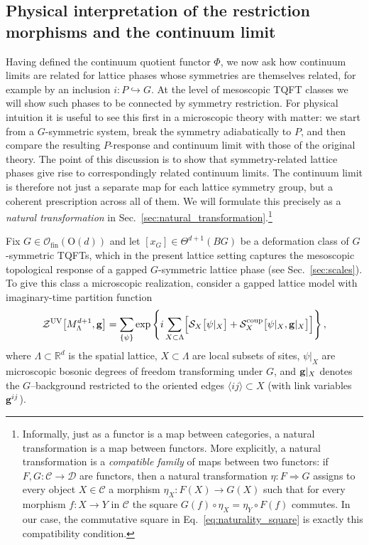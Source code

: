 \documentclass[aps,prx,reprint,superscriptaddress,twocolumn,amsmath,amssymb,amsfonts, nofootinbib]{revtex4-2}
\newcommand{\ofin}{\mathcal{O}_{\text{fin}}}
\theoremstyle{apsstyle}
\begin{document}
\subsection{Physical interpretation of the restriction morphisms and the continuum limit} 
\label{sec:restriction_morphisms}
Having defined the continuum quotient functor $\Phi$, we now ask how continuum limits are related for lattice phases whose symmetries are themselves related, for example by an inclusion $i: P\hookrightarrow G.$ At the level of mesoscopic TQFT classes  we will show such phases to be connected by symmetry restriction. For physical intuition it is useful to see this first in a microscopic theory with matter: we start from a $G$-symmetric system, break the symmetry adiabatically to $P$, and then compare the resulting $P$-response and continuum limit with those of the original theory. The point of this discussion is to show that symmetry-related lattice phases give rise to correspondingly related continuum limits. The continuum limit is therefore not just a separate map for each lattice symmetry group, but a coherent prescription across all of them. We will formulate this precisely as a \emph{natural transformation} in Sec.~\ref{sec:natural_transformation}.\footnote{\label{ft:natural_transformation}Informally, just as a functor is a map between categories, a natural transformation is a map between functors. More explicitly, a natural transformation is a \emph{compatible family} of maps between two functors: if $F,G:\mathcal{C}\to\mathcal{D}$ are functors, then a natural transformation $\eta:F\Rightarrow G$ assigns to every object $X\in\mathcal{C}$ a morphism $\eta_X:F(X)\to G(X)$ such that for every morphism $f:X\to Y$ in $\mathcal{C}$ the square $G(f)\circ \eta_X=\eta_Y\circ F(f)$ commutes. In our case, the commutative square in Eq.~\ref{eq:naturality_square} is exactly this compatibility condition.}


\bigskip 

Fix $G\in \ofin(\mathrm{O}(d))$ and let $[x_G]\in \Theta^{d+1}(BG)$ be a deformation class of $G$-symmetric TQFTs, which in the present lattice setting captures the mesoscopic topological response of a gapped $G$-symmetric lattice phase (see Sec.~\ref{sec:scales}). To give this class a microscopic realization, consider a gapped lattice model with imaginary-time partition function
\begin{equation*}
    \mathcal{Z}^{\mathrm{UV}}\bigl[M^{d+1}_\Lambda, {\bf g}\bigr]
    =\sum_{\{\psi\}} \exp\left\{
      i \sum_{X \subset \Lambda}
      \Bigl[\mathcal S_{X}\bigl[\psi\vert_{X}\bigr]
      + \mathcal{S}_{X}^{\mathrm{coup}}\bigl[\psi\vert_{X}, {\bf g}\vert_{X}\bigr] \Bigr]
    \right\},
\end{equation*}
where $\Lambda\subset \mathbb R^{d}$ is the spatial lattice, $X\subset \Lambda$ are local subsets of sites, $\psi\vert_X$ are microscopic bosonic degrees of freedom transforming under $G$, and ${\bf g}\vert_X$ denotes the $G$–background restricted to the oriented edges $\langle ij\rangle\subset X$ (with link variables ${\bf g}^{ij}$). 
\end{document}
